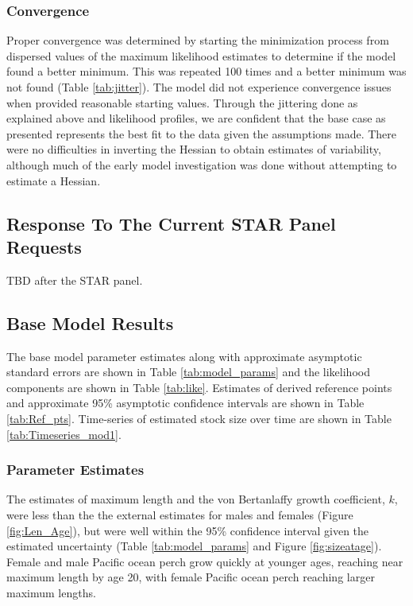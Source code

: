 \documentclass[12pt,]{article}
\begin{document}
\subsubsection{Convergence}\label{convergence}

Proper convergence was determined by starting the minimization process
from dispersed values of the maximum likelihood estimates to determine
if the model found a better minimum. This was repeated 100 times and a
better minimum was not found (Table \ref{tab:jitter}). The model did not
experience convergence issues when provided reasonable starting values.
Through the jittering done as explained above and likelihood profiles,
we are confident that the base case as presented represents the best fit
to the data given the assumptions made. There were no difficulties in
inverting the Hessian to obtain estimates of variability, although much
of the early model investigation was done without attempting to estimate
a Hessian.

\subsection{Response To The Current STAR Panel
Requests}\label{response-to-the-current-star-panel-requests}

TBD after the STAR panel.

\subsection{Base Model Results}\label{base-model-results}

The base model parameter estimates along with approximate asymptotic
standard errors are shown in Table \ref{tab:model_params} and the
likelihood components are shown in Table \ref{tab:like}. Estimates of
derived reference points and approximate 95\% asymptotic confidence
intervals are shown in Table \ref{tab:Ref_pts}. Time-series of estimated
stock size over time are shown in Table \ref{tab:Timeseries_mod1}.

\subsubsection{Parameter Estimates}\label{parameter-estimates}

The estimates of maximum length and the von Bertanlaffy growth
coefficient, \(k\), were less than the the external estimates for males
and females (Figure \ref{fig:Len_Age}), but were well within the 95\%
confidence interval given the estimated uncertainty (Table
\ref{tab:model_params} and Figure \ref{fig:sizeatage}). Female and male
Pacific ocean perch grow quickly at younger ages, reaching near maximum
length by age 20, with female Pacific ocean perch reaching larger
maximum lengths.
\end{document}
